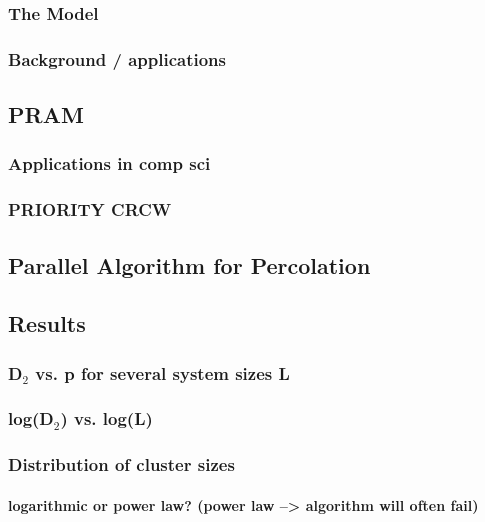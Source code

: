 \documentclass{article}
\begin{document}
\subsubsection{The Model}
\label{sec-4.2.1}
\subsubsection{Background / applications}
\label{sec-4.2.2}
\subsection{PRAM}
\label{sec-4.3}
\subsubsection{Applications in comp sci}
\label{sec-4.3.1}
\subsubsection{PRIORITY CRCW}
\label{sec-4.3.2}
\subsection{Parallel Algorithm for Percolation}
\label{sec-4.4}
\subsection{Results}
\label{sec-4.5}
\subsubsection{D$_2$ vs. p for several system sizes L}
\label{sec-4.5.1}
\subsubsection{log(D$_2$) vs. log(L)}
\label{sec-4.5.2}
\subsubsection{Distribution of cluster sizes}
\label{sec-4.5.3}
\paragraph{logarithmic or power law? (power law --> algorithm will often fail)}
\label{sec-4.5.3.1}






 
    

    
\end{document}

